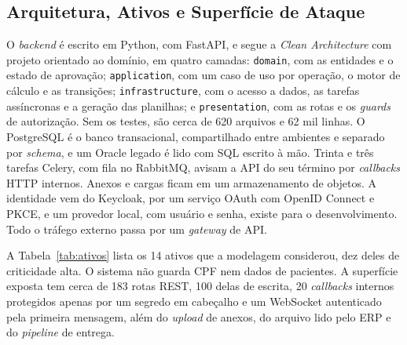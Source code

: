 \documentclass[conference]{IEEEtran}
\begin{document}
\subsection{Arquitetura, Ativos e Superfície de Ataque}
\label{subsec:arq-atual}
\label{subsec:ativos}

O \textit{backend} é escrito em Python, com FastAPI, e segue a \textit{Clean Architecture} com projeto orientado ao domínio, em quatro camadas: \texttt{domain}, com as entidades e o estado de aprovação; \texttt{application}, com um caso de uso por operação, o motor de cálculo e as transições; \texttt{infrastructure}, com o acesso a dados, as tarefas assíncronas e a geração das planilhas; e \texttt{presentation}, com as rotas e os \textit{guards} de autorização. Sem os testes, são cerca de 620 arquivos e 62 mil linhas. O PostgreSQL é o banco transacional, compartilhado entre ambientes e separado por \textit{schema}, e um Oracle legado é lido com SQL escrito à mão. Trinta e três tarefas Celery, com fila no RabbitMQ, avisam a API do seu término por \textit{callbacks} HTTP internos. Anexos e cargas ficam em um armazenamento de objetos. A identidade vem do Keycloak, por um serviço OAuth com OpenID Connect e PKCE, e um provedor local, com usuário e senha, existe para o desenvolvimento. Todo o tráfego externo passa por um \textit{gateway} de API.

A Tabela~\ref{tab:ativos} lista os 14 ativos que a modelagem considerou, dez deles de criticidade alta. O sistema não guarda CPF nem dados de pacientes. A superfície exposta tem cerca de 183 rotas REST, 100 delas de escrita, 20 \textit{callbacks} internos protegidos apenas por um segredo em cabeçalho e um WebSocket autenticado pela primeira mensagem, além do \textit{upload} de anexos, do arquivo lido pelo ERP e do \textit{pipeline} de entrega.
\end{document}

